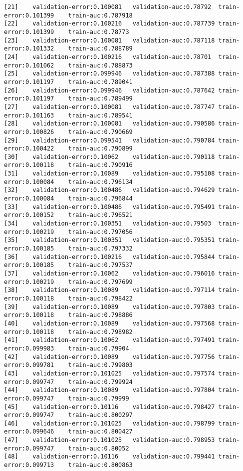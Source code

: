 \documentclass[11pt]{article}
\begin{document}
\begin{Verbatim}[commandchars=\\\{\}]
[21]	validation-error:0.100081	validation-auc:0.78792	train-error:0.101399	train-auc:0.787918
[22]	validation-error:0.100216	validation-auc:0.787739	train-error:0.101399	train-auc:0.78773
[23]	validation-error:0.100081	validation-auc:0.787118	train-error:0.101332	train-auc:0.788789
[24]	validation-error:0.100216	validation-auc:0.78701	train-error:0.101062	train-auc:0.788873
[25]	validation-error:0.099946	validation-auc:0.787388	train-error:0.101197	train-auc:0.789041
[26]	validation-error:0.099946	validation-auc:0.787642	train-error:0.101197	train-auc:0.789499
[27]	validation-error:0.100081	validation-auc:0.787747	train-error:0.101163	train-auc:0.789541
[28]	validation-error:0.100081	validation-auc:0.790586	train-error:0.100826	train-auc:0.790669
[29]	validation-error:0.099541	validation-auc:0.790784	train-error:0.100422	train-auc:0.790899
[30]	validation-error:0.10062	validation-auc:0.790118	train-error:0.100118	train-auc:0.790916
[31]	validation-error:0.10089	validation-auc:0.795108	train-error:0.100084	train-auc:0.796134
[32]	validation-error:0.100486	validation-auc:0.794629	train-error:0.100084	train-auc:0.796844
[33]	validation-error:0.100486	validation-auc:0.795491	train-error:0.100152	train-auc:0.796521
[34]	validation-error:0.100351	validation-auc:0.79503	train-error:0.100219	train-auc:0.797056
[35]	validation-error:0.100351	validation-auc:0.795351	train-error:0.100185	train-auc:0.797332
[36]	validation-error:0.100216	validation-auc:0.795844	train-error:0.100185	train-auc:0.797537
[37]	validation-error:0.10062	validation-auc:0.796016	train-error:0.100219	train-auc:0.797699
[38]	validation-error:0.10089	validation-auc:0.797114	train-error:0.100118	train-auc:0.798422
[39]	validation-error:0.10089	validation-auc:0.797803	train-error:0.100118	train-auc:0.798886
[40]	validation-error:0.10089	validation-auc:0.797568	train-error:0.100118	train-auc:0.798982
[41]	validation-error:0.10062	validation-auc:0.797491	train-error:0.099983	train-auc:0.79904
[42]	validation-error:0.10089	validation-auc:0.797756	train-error:0.099781	train-auc:0.799803
[43]	validation-error:0.101025	validation-auc:0.797574	train-error:0.099747	train-auc:0.799924
[44]	validation-error:0.10089	validation-auc:0.797804	train-error:0.099747	train-auc:0.79999
[45]	validation-error:0.10116	validation-auc:0.798427	train-error:0.099747	train-auc:0.800297
[46]	validation-error:0.101025	validation-auc:0.798799	train-error:0.099646	train-auc:0.800427
[47]	validation-error:0.101025	validation-auc:0.798953	train-error:0.099747	train-auc:0.80052
[48]	validation-error:0.10116	validation-auc:0.799441	train-error:0.099713	train-auc:0.800863

\end{Verbatim}
\end{document}
